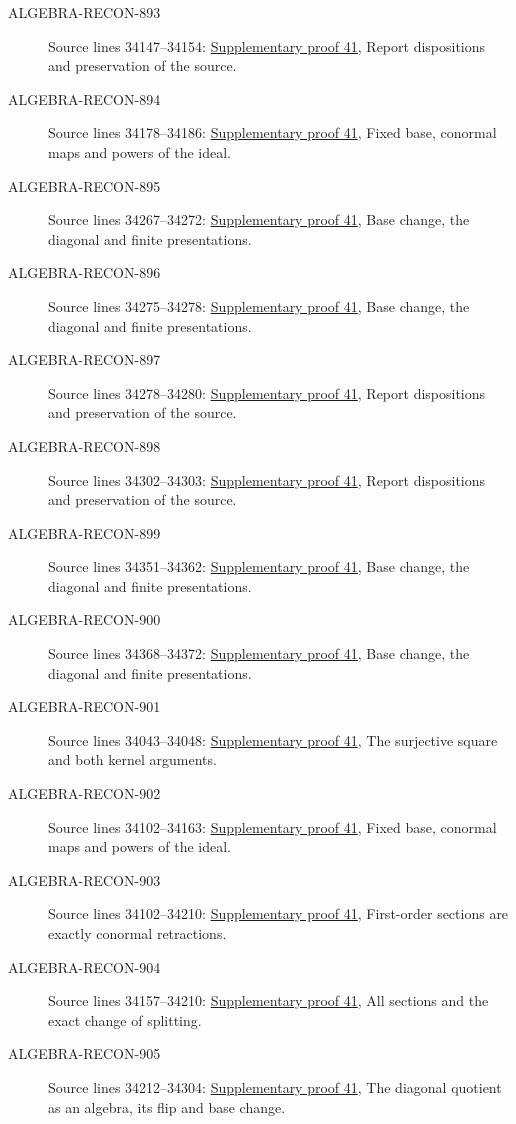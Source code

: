 \begin{description}
\item[ALGEBRA-RECON-893] Source lines 34147--34154: \hyperlink{algebra_differentials_notes_20260928}{Supplementary proof 41}, Report dispositions and preservation of the source.
\item[ALGEBRA-RECON-894] Source lines 34178--34186: \hyperlink{algebra_differentials_notes_20260928}{Supplementary proof 41}, Fixed base, conormal maps and powers of the ideal.
\item[ALGEBRA-RECON-895] Source lines 34267--34272: \hyperlink{algebra_differentials_notes_20260928}{Supplementary proof 41}, Base change, the diagonal and finite presentations.
\item[ALGEBRA-RECON-896] Source lines 34275--34278: \hyperlink{algebra_differentials_notes_20260928}{Supplementary proof 41}, Base change, the diagonal and finite presentations.
\item[ALGEBRA-RECON-897] Source lines 34278--34280: \hyperlink{algebra_differentials_notes_20260928}{Supplementary proof 41}, Report dispositions and preservation of the source.
\item[ALGEBRA-RECON-898] Source lines 34302--34303: \hyperlink{algebra_differentials_notes_20260928}{Supplementary proof 41}, Report dispositions and preservation of the source.
\item[ALGEBRA-RECON-899] Source lines 34351--34362: \hyperlink{algebra_differentials_notes_20260928}{Supplementary proof 41}, Base change, the diagonal and finite presentations.
\item[ALGEBRA-RECON-900] Source lines 34368--34372: \hyperlink{algebra_differentials_notes_20260928}{Supplementary proof 41}, Base change, the diagonal and finite presentations.
\item[ALGEBRA-RECON-901] Source lines 34043--34048: \hyperlink{algebra_differentials_notes_20260928}{Supplementary proof 41}, The surjective square and both kernel arguments.
\item[ALGEBRA-RECON-902] Source lines 34102--34163: \hyperlink{algebra_differentials_notes_20260928}{Supplementary proof 41}, Fixed base, conormal maps and powers of the ideal.
\item[ALGEBRA-RECON-903] Source lines 34102--34210: \hyperlink{algebra_differentials_notes_20260928}{Supplementary proof 41}, First-order sections are exactly conormal retractions.
\item[ALGEBRA-RECON-904] Source lines 34157--34210: \hyperlink{algebra_differentials_notes_20260928}{Supplementary proof 41}, All sections and the exact change of splitting.
\item[ALGEBRA-RECON-905] Source lines 34212--34304: \hyperlink{algebra_differentials_notes_20260928}{Supplementary proof 41}, The diagonal quotient as an algebra, its flip and base change.
\end{description}

